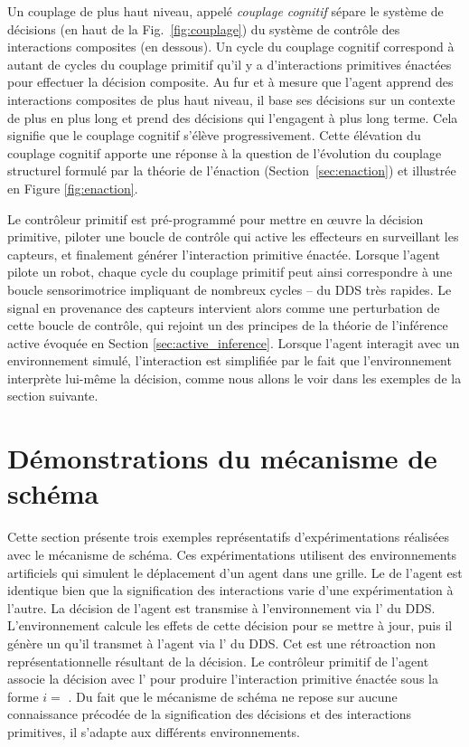 Un couplage de plus haut niveau, appelé \emph{couplage cognitif} sépare le système de décisions (en haut de la Fig.~\ref{fig:couplage}) du système de contrôle des interactions composites (en dessous). 
Un cycle du couplage cognitif correspond à autant de cycles du couplage primitif qu'il y a d'interactions primitives énactées pour effectuer la décision composite.
Au fur et à mesure que l'agent apprend des interactions composites de plus haut niveau, il base ses décisions sur un contexte de plus en plus long et prend des décisions qui l'engagent à plus long terme. 
Cela signifie que le couplage cognitif s'élève progressivement.
Cette élévation du couplage cognitif apporte une réponse à la question de l'évolution du couplage structurel formulé par la théorie de l'énaction (Section~\ref{sec:enaction}) et illustrée en Figure \ref{fig:enaction}.


Le contrôleur primitif est pré-programmé pour mettre en \oe uvre la décision primitive, piloter une boucle de contrôle qui active les effecteurs en surveillant les capteurs, et finalement générer l'interaction primitive énactée. 
Lorsque l'agent pilote un robot, chaque cycle du couplage primitif peut ainsi correspondre à une boucle sensorimotrice impliquant de nombreux cycles  --  du DDS très rapides. 
Le signal en provenance des capteurs intervient alors comme une perturbation de cette boucle de contrôle, qui rejoint un des principes de la théorie de l'inférence active évoquée en Section \ref{sec:active_inference}.
Lorsque l'agent interagit avec un environnement simulé, l'interaction est simplifiée par le fait que l'environnement interprète lui-même la décision, %
comme nous allons le voir dans les exemples de la section suivante. 




\section{Démonstrations du mécanisme de schéma}
\label{sec:demo-schema}

\noindent
Cette section présente trois exemples représentatifs d'expérimentations réalisées avec le mécanisme de schéma. 
Ces expérimentations utilisent des environnements artificiels qui simulent le déplacement d'un agent dans une grille. 
Le  de l'agent est identique bien que la signification des interactions varie d'une expérimentation à l'autre. 
La décision de l'agent est transmise à l'environnement via l' du DDS.
L'environnement calcule les effets de cette décision pour se mettre à jour, puis il génère un  qu'il transmet à l'agent via l' du DDS. 
Cet  est une rétroaction non représentationnelle résultant de la décision. 
Le contrôleur primitif de l'agent associe la décision avec l' pour produire l'interaction primitive énactée sous la forme $i=$ .
Du fait que le mécanisme de schéma ne repose sur aucune connaissance précodée de la signification des décisions et des interactions primitives, il s'adapte aux différents environnements. 



